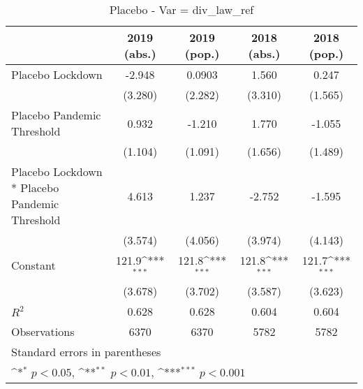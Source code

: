\documentclass{article}
\begin{document}
{
\def\sym#1{\ifmmode^{#1}\else\(^{#1}\)\fi}
\begin{longtable}{l*{4}{c}}
\caption{Placebo - Var = div\_law\_ref}\\
\hline\hline\endfirsthead\hline\endhead\hline\endfoot\endlastfoot
                &\multicolumn{1}{c}{2019 (abs.)}&\multicolumn{1}{c}{2019 (pop.)}&\multicolumn{1}{c}{2018 (abs.)}&\multicolumn{1}{c}{2018 (pop.)}\\
\hline
Placebo Lockdown&   -2.948         &   0.0903         &    1.560         &    0.247         \\
                &  (3.280)         &  (2.282)         &  (3.310)         &  (1.565)         \\
Placebo Pandemic Threshold&    0.932         &   -1.210         &    1.770         &   -1.055         \\
                &  (1.104)         &  (1.091)         &  (1.656)         &  (1.489)         \\
Placebo Lockdown * Placebo Pandemic Threshold&    4.613         &    1.237         &   -2.752         &   -1.595         \\
                &  (3.574)         &  (4.056)         &  (3.974)         &  (4.143)         \\
Constant        &    121.9\sym{***}&    121.8\sym{***}&    121.8\sym{***}&    121.7\sym{***}\\
                &  (3.678)         &  (3.702)         &  (3.587)         &  (3.623)         \\
\hline
\(R^{2}\)       &    0.628         &    0.628         &    0.604         &    0.604         \\
Observations    &     6370         &     6370         &     5782         &     5782         \\
\hline\hline
\multicolumn{5}{l}{\footnotesize Standard errors in parentheses}\\
\multicolumn{5}{l}{\footnotesize \sym{*} \(p<0.05\), \sym{**} \(p<0.01\), \sym{***} \(p<0.001\)}\\
\end{longtable}
}
\end{document}
